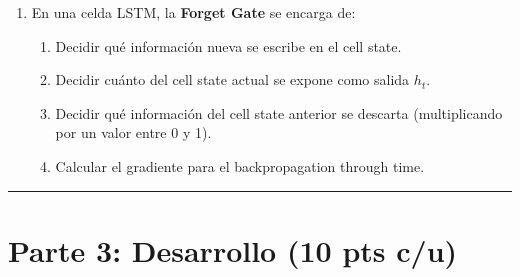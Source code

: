 \documentclass[12pt,a4paper]{article}
\begin{document}
\begin{enumerate}[label=\arabic*)]
    \item En una celda LSTM, la \textbf{Forget Gate} se encarga de:
    \begin{enumerate}[label=\Alph*)]
        \item Decidir qué información nueva se escribe en el cell state.
        \item Decidir cuánto del cell state actual se expone como salida $h_t$.
        \item Decidir qué información del cell state anterior se descarta (multiplicando por un valor entre 0 y 1).
        \item Calcular el gradiente para el backpropagation through time.
    \end{enumerate}
\end{enumerate}

\vspace{0.5cm}
\hrule
\vspace{0.5cm}

\section*{Parte 3: Desarrollo (10 pts c/u)}
\end{document}
